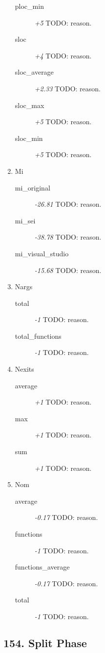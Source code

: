 \begin{enumerate}
\begin{description}
          \item [ploc\_min] \textit{+5} TODO: reason.
          \item [sloc] \textit{+4} TODO: reason.
          \item [sloc\_average] \textit{+2.33} TODO: reason.
          \item [sloc\_max] \textit{+5} TODO: reason.
          \item [sloc\_min] \textit{+5} TODO: reason.
        \end{description}
  \item Mi
        \begin{description}
          \item [mi\_original] \textit{-26.81} TODO: reason.
          \item [mi\_sei] \textit{-38.78} TODO: reason.
          \item [mi\_visual\_studio] \textit{-15.68} TODO: reason.
        \end{description}
  \item Nargs
        \begin{description}
          \item [total] \textit{-1} TODO: reason.
          \item [total\_functions] \textit{-1} TODO: reason.
        \end{description}
  \item Nexits
        \begin{description}
          \item [average] \textit{+1} TODO: reason.
          \item [max] \textit{+1} TODO: reason.
          \item [sum] \textit{+1} TODO: reason.
        \end{description}
  \item Nom
        \begin{description}
          \item [average] \textit{-0.17} TODO: reason.
          \item [functions] \textit{-1} TODO: reason.
          \item [functions\_average] \textit{-0.17} TODO: reason.
          \item [total] \textit{-1} TODO: reason.
        \end{description}
\end{enumerate}
\subsection{154. Split Phase}

